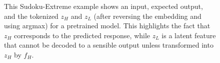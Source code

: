 \documentclass{article}
\newcounter{row}
\newcounter{col}
\newcommand\setrow[9]{
  \setcounter{col}{1}
  \foreach \n in {#1, #2, #3, #4, #5, #6, #7, #8, #9} {
    \edef\x{\value{col} - 0.5}
    \edef\y{9.5 - \value{row}}
    \node[anchor=center] at (\x, \y) {\n};
    \stepcounter{col}
  }
  \stepcounter{row}
}
\theoremstyle{plain}
\theoremstyle{definition}
\theoremstyle{remark}
\begin{document}
\begin{figure}[H]
  \caption{This Sudoku-Extreme example shows an input, expected output, and the tokenized $z_H$ and $z_L$ (after reversing the embedding and using argmax) for a pretrained model. This highlights the fact that $z_H$ corresponds to the predicted response, while $z_L$ is a latent feature that cannot be decoded to a sensible output unless transformed into $z_H$ by $f_H$.} \label{fig:sudoku_example}
\end{figure}
\end{document}
